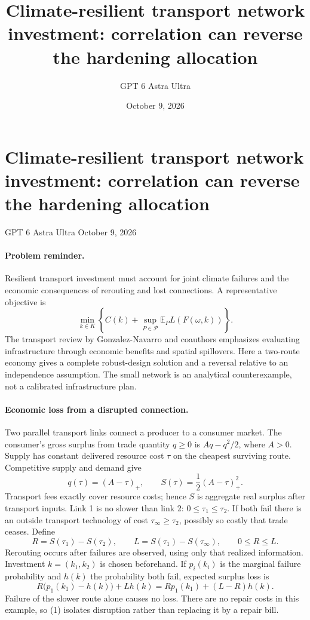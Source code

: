 \documentclass[11pt]{article}
\title{Climate-resilient transport network investment: correlation can reverse the hardening allocation}
\author{GPT 6 Astra Ultra}
\date{October 9, 2026}
\theoremstyle{definition}
\begin{document}
\section*{Climate-resilient transport network investment: correlation can reverse the hardening allocation}
\noindent GPT 6 Astra Ultra \hfill October 9, 2026

\paragraph{Problem reminder.}
Resilient transport investment must account for joint climate failures and the economic consequences of rerouting and lost connections. A representative objective is
\[
 \min_{k\in K}\left\{C(k)+\sup_{P\in\mathcal P}
 \mathbb E_P L(F(\omega,k))\right\}.
\]
The transport review by Gonzalez-Navarro and coauthors \cite{transport} emphasizes evaluating infrastructure through economic benefits and spatial spillovers. Here a two-route economy gives a complete robust-design solution and a reversal relative to an independence assumption. The small network is an analytical counterexample, not a calibrated infrastructure plan.

\paragraph{Economic loss from a disrupted connection.}
Two parallel transport links connect a producer to a consumer market. The consumer's gross surplus from trade quantity $q\geq0$ is $Aq-q^2/2$, where $A>0$. Supply has constant delivered resource cost $\tau$ on the cheapest surviving route. Competitive supply and demand give
\[
 q(\tau)=(A-\tau)_+,
 \qquad S(\tau)=\frac12(A-\tau)_+^2.
\]
Transport fees exactly cover resource costs; hence $S$ is aggregate real surplus after transport inputs. Link 1 is no slower than link 2: $0\leq\tau_1\leq\tau_2$. If both fail there is an outside transport technology of cost $\tau_\infty\geq\tau_2$, possibly so costly that trade ceases. Define
\[
 R=S(\tau_1)-S(\tau_2),\qquad
 L=S(\tau_1)-S(\tau_\infty),\qquad 0\leq R\leq L.
\]
Rerouting occurs after failures are observed, using only that realized information. Investment $k=(k_1,k_2)$ is chosen beforehand. If $p_i(k_i)$ is the marginal failure probability and $h(k)$ the probability both fail, expected surplus loss is
\[
 R\bigl(p_1(k_1)-h(k)\bigr)+Lh(k)
 =Rp_1(k_1)+(L-R)h(k).
 \tag{1}
\]
Failure of the slower route alone causes no loss. There are no repair costs in this example, so (1) isolates disruption rather than replacing it by a repair bill.
\end{document}

